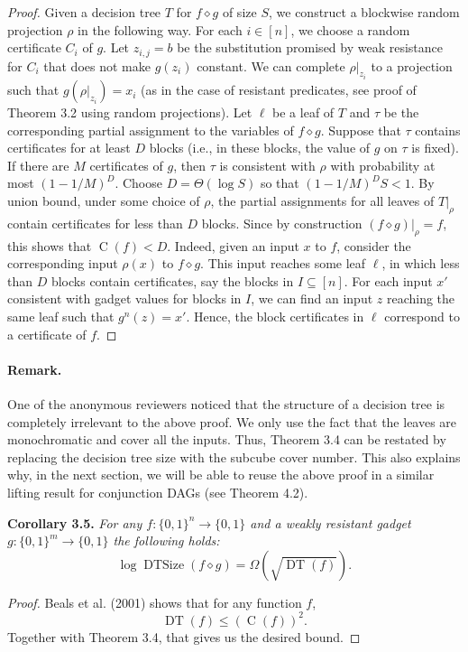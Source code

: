 \documentclass[10pt,a4paper]{article}
\newcommand{\bits}{\{0,1\}}
\newcommand{\DT}{\operatorname{DT}}
\newcommand{\DTSize}{\operatorname{DTSize}}
\newcommand{\CC}{\operatorname C}
\newcommand{\comp}{\diamond}
\newenvironment{originalresult}[1]{\par\medskip\noindent\textbf{#1.}\itshape}{\par\medskip}
\begin{document}
\begin{proof}
Given a decision tree $T$ for $f\comp g$ of size $S$, we construct a blockwise random projection $\rho$ in the following way. For each $i\in[n]$, we choose a random certificate $C_i$ of $g$. Let $z_{i,j}=b$ be the substitution promised by weak resistance for $C_i$ that does not make $g(z_i)$ constant. We can complete $\rho|_{z_i}$ to a projection such that $g(\rho|_{z_i})=x_i$ (as in the case of resistant predicates, see proof of Theorem 3.2 using random projections).
Let $\ell$ be a leaf of $T$ and $\tau$ be the corresponding partial assignment to the variables of $f\comp g$. Suppose that $\tau$ contains certificates for at least $D$ blocks (i.e., in these blocks, the value of $g$ on $\tau$ is fixed). If there are $M$ certificates of $g$, then $\tau$ is consistent with $\rho$ with probability at most $(1-1/M)^D$. Choose $D=\Theta(\log S)$ so that $(1-1/M)^DS<1$. By union bound, under some choice of $\rho$, the partial assignments for all leaves of $T|_\rho$ contain certificates for less than $D$ blocks. Since by construction $(f\comp g)|_\rho=f$, this shows that $\CC(f)<D$.
Indeed, given an input $x$ to $f$, consider the corresponding input $\rho(x)$ to $f\comp g$. This input reaches some leaf $\ell$, in which less than $D$ blocks contain certificates, say the blocks in $I\subseteq[n]$. For each input $x'$ consistent with gadget values for blocks in $I$, we can find an input $z$ reaching the same leaf such that $g^n(z)=x'$. Hence, the block certificates in $\ell$ correspond to a certificate of $f$.
\end{proof}
\paragraph{Remark.} One of the anonymous reviewers noticed that the structure of a decision tree is completely irrelevant to the above proof. We only use the fact that the leaves are monochromatic and cover all the inputs. Thus, Theorem 3.4 can be restated by replacing the decision tree size with the subcube cover number. This also explains why, in the next section, we will be able to reuse the above proof in a similar lifting result for conjunction DAGs (see Theorem 4.2).
\begin{originalresult}{Corollary 3.5}
For any $f:\bits^n\to\bits$ and a weakly resistant gadget $g:\bits^m\to\bits$ the following holds:
\[\log\DTSize(f\comp g)=\Omega(\sqrt{\DT(f)}).\]
\end{originalresult}
\begin{proof}
Beals et al. (2001) shows that for any function $f$,
\[\DT(f)\le(\CC(f))^2.\]
Together with Theorem 3.4, that gives us the desired bound.
\end{proof}
\end{document}
